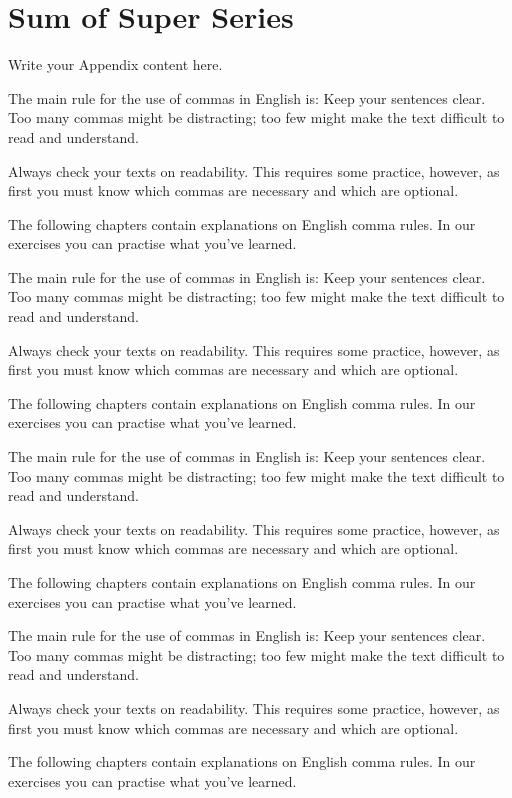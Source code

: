 \chapter{Sum of Super Series} 
\label{AppendixC} 


Write your Appendix content here.

The main rule for the use of commas in English is: Keep your sentences clear. Too many commas might be distracting; too few might make the text difficult to read and understand.

Always check your texts on readability. This requires some practice, however, as first you must know which commas are necessary and which are optional.

The following chapters contain explanations on English comma rules. In our exercises you can practise what you've learned.



The main rule for the use of commas in English is: Keep your sentences clear. Too many commas might be distracting; too few might make the text difficult to read and understand.

Always check your texts on readability. This requires some practice, however, as first you must know which commas are necessary and which are optional.

The following chapters contain explanations on English comma rules. In our exercises you can practise what you've learned.



The main rule for the use of commas in English is: Keep your sentences clear. Too many commas might be distracting; too few might make the text difficult to read and understand.

Always check your texts on readability. This requires some practice, however, as first you must know which commas are necessary and which are optional.

The following chapters contain explanations on English comma rules. In our exercises you can practise what you've learned.


The main rule for the use of commas in English is: Keep your sentences clear. Too many commas might be distracting; too few might make the text difficult to read and understand.

Always check your texts on readability. This requires some practice, however, as first you must know which commas are necessary and which are optional.

The following chapters contain explanations on English comma rules. In our exercises you can practise what you've learned.



